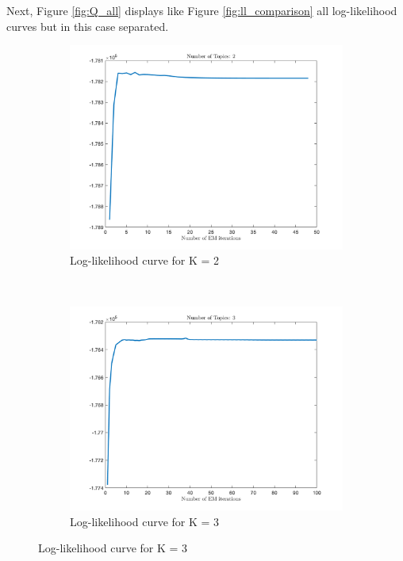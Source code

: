 \documentclass[12pt]{article}
\begin{document}
Next, Figure \ref{fig:Q_all} displays like Figure \ref{fig:ll_comparison} all log-likelihood curves but in this case separated. \\

\begin{figure}[h]
	\centering
	\begin{subfigure}{0.45\textwidth}
		\includegraphics[width=\textwidth]{images/Q_2_topics.png}
		\caption{Log-likelihood curve for K = 2}
		\label{fig:Q2}
	\end{subfigure}
	~	
	\begin{subfigure}{0.45\textwidth}
		\includegraphics[width=\textwidth]{images/Q_3_topics.png}
		\caption{Log-likelihood curve for K = 3}
		\label{fig:Q3}
	\end{subfigure}

\end{figure}
\end{document}
